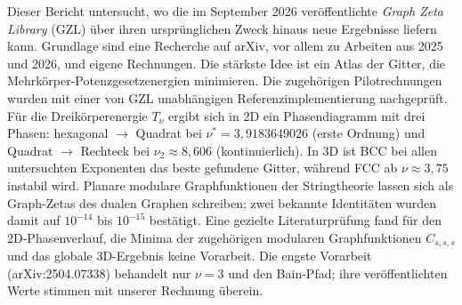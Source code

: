 Dieser Bericht untersucht, wo die im September 2026 veröffentlichte \emph{Graph Zeta Library} (GZL) über ihren ursprünglichen Zweck hinaus neue Ergebnisse liefern kann. Grundlage sind eine Recherche auf arXiv, vor allem zu Arbeiten aus 2025 und 2026, und eigene Rechnungen. Die stärkste Idee ist ein Atlas der Gitter, die Mehrkörper-Potenzgesetzenergien minimieren. Die zugehörigen Pilotrechnungen wurden mit einer von GZL unabhängigen Referenzimplementierung nachgeprüft. Für die Dreikörperenergie $T_\nu$ ergibt sich in 2D ein Phasendiagramm mit drei Phasen: hexagonal $\to$ Quadrat bei $\nu^*=3{,}9183649026$ (erste Ordnung) und Quadrat $\to$ Rechteck bei $\nu_2\approx 8{,}606$ (kontinuierlich). In 3D ist BCC bei allen untersuchten Exponenten das beste gefundene Gitter, während FCC ab $\nu\approx 3{,}75$ instabil wird. Planare modulare Graphfunktionen der Stringtheorie lassen sich als Graph-Zetas des dualen Graphen schreiben; zwei bekannte Identitäten wurden damit auf $10^{-14}$ bis $10^{-15}$ bestätigt.
Eine gezielte Literaturprüfung fand für den 2D-Phasenverlauf, die Minima der zugehörigen modularen Graphfunktionen $C_{s,s,s}$ und das globale 3D-Ergebnis keine Vorarbeit. Die engste Vorarbeit (arXiv:2504.07338) behandelt nur $\nu=3$ und den Bain-Pfad; ihre veröffentlichten Werte stimmen mit unserer Rechnung überein.
